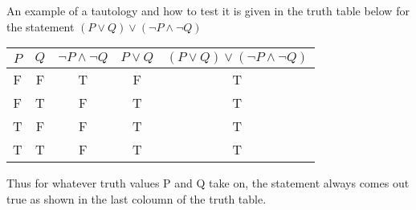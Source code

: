 \documentclass[12pt]{article}
\begin{document}
An example of a tautology and how to test it is given in the truth table below for the statement $(P \vee Q) \vee ( \neg P \wedge \neg Q) $


\begin{center}
\begin{tabular}{ccccc}
$P$ & $Q$ & $\neg P \wedge \neg Q$ & $P \vee Q$ & $(P \vee Q) \vee ( \neg P \wedge \neg Q)$ \\
\hline
F & F & T & F & T \\
F & T & F & T & T \\
T & F & F & T & T \\
T & T & F & T & T
\end{tabular}
\end{center}


Thus for whatever truth values P and Q take on, the statement always comes out true as shown in the last coloumn of the truth table.
\end{document}
